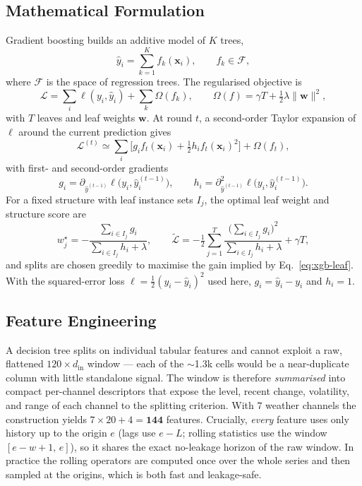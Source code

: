\documentclass[12pt,a4paper,oneside]{report}
\begin{document}
\subsection{Mathematical Formulation}
\label{sec:xgb-theory}
Gradient boosting builds an additive model of $K$ trees,
\[
  \hat{y}_i = \sum_{k=1}^{K} f_k(\mathbf{x}_i), \qquad f_k \in \mathcal{F},
\]
where $\mathcal{F}$ is the space of regression trees. The regularised objective is
\begin{equation}
  \mathcal{L} = \sum_{i} \ell(y_i, \hat{y}_i) + \sum_{k} \Omega(f_k),
  \qquad
  \Omega(f) = \gamma T + \tfrac{1}{2}\lambda \lVert \mathbf{w} \rVert^2,
  \label{eq:xgb-obj}
\end{equation}
with $T$ leaves and leaf weights $\mathbf{w}$. At round $t$, a second-order Taylor
expansion of $\ell$ around the current prediction gives
\begin{equation}
  \mathcal{L}^{(t)} \simeq
  \sum_{i} \Big[ g_i f_t(\mathbf{x}_i) + \tfrac{1}{2} h_i f_t(\mathbf{x}_i)^2 \Big]
  + \Omega(f_t),
  \label{eq:xgb-taylor}
\end{equation}
with first- and second-order gradients
\begin{equation}
  g_i = \partial_{\hat{y}^{(t-1)}} \ell\big(y_i, \hat{y}_i^{(t-1)}\big),
  \qquad
  h_i = \partial^2_{\hat{y}^{(t-1)}} \ell\big(y_i, \hat{y}_i^{(t-1)}\big).
  \label{eq:xgb-grads}
\end{equation}
For a fixed structure with leaf instance sets $I_j$, the optimal leaf weight and
structure score are
\begin{equation}
  w_j^{\star} = -\frac{\sum_{i \in I_j} g_i}{\sum_{i \in I_j} h_i + \lambda},
  \qquad
  \tilde{\mathcal{L}} = -\tfrac{1}{2}\sum_{j=1}^{T}
  \frac{\big(\sum_{i \in I_j} g_i\big)^2}{\sum_{i \in I_j} h_i + \lambda}
  + \gamma T ,
  \label{eq:xgb-leaf}
\end{equation}
and splits are chosen greedily to maximise the gain implied by
Eq.~\eqref{eq:xgb-leaf}. With the squared-error loss
$\ell = \tfrac{1}{2}(y_i-\hat{y}_i)^2$ used here, $g_i = \hat{y}_i - y_i$ and
$h_i = 1$.

\subsection{Feature Engineering}
\label{sec:xgb-fe}
A decision tree splits on individual tabular features and cannot exploit a raw,
flattened $120 \times d_{\text{in}}$ window --- each of the $\sim$1.3k cells would
be a near-duplicate column with little standalone signal. The window is therefore
\emph{summarised} into compact per-channel descriptors that expose the level,
recent change, volatility, and range of each channel to the splitting criterion.
With $7$ weather channels the construction yields
$7 \times 20 + 4 = \mathbf{144}$ features. Crucially, \emph{every} feature uses
only history up to the origin $e$ (lags use $e-L$; rolling statistics use the
window $[e-w+1,\,e]$), so it shares the exact no-leakage horizon of the raw window.
In practice the rolling operators are computed once over the whole series and then
sampled at the origins, which is both fast and leakage-safe.
\end{document}
